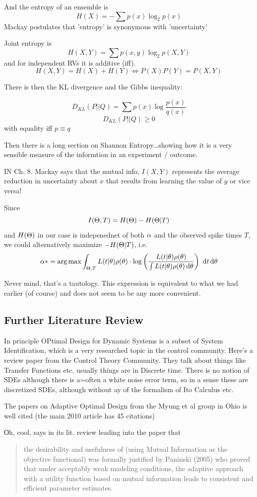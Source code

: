 \documentclass{article}
\begin{document}
And the entropy of an ensemble is 
$$ H(X) = -\sum p(x) \log_2 p(x)$$
Mackay postulates that 'entropy' is synonymous with 'uncertainty'

Joint entropy is 
$$ H(X,Y) = \sum p(x,y) \log_2 p(X,Y)$$ and for independent RVs it is additive
(iff). 
$$
H(X,Y) =  H(X) + H(Y) \iff P(X)P(Y) = P(X,Y)
$$

There is then the KL divergence  and the Gibbs inequality:

$$D_{KL} (P||Q) = \sum p(x) \log \frac{p(x)}{q(x)}$$
$$D_{KL} (P||Q)  \geq 0$$ with equality iff $p \equiv q$

Then there is a long section on Shannon Entropy\ldots showing how it is a very
sensible measure of the informtion in an experiment / outcome. 

IN Ch. 8. Mackay says that the mutual info, $I(X,Y)$ represents the average
reduction in uncertainty about $x$ that results from learning the value of $y$
or vice versa! 

Since 
$$I({\Theta}, T) = H({\Theta}) - H({\Theta}|T)$$ and $H({\Theta})$ in our case is indepenednet of
both ${\alpha}$ and the observed spike times $T$, we could alternatively maximize
$-H({\Theta}|T)$, i.e.
$$
\a* = \argmax \int_{\Th, T}  L(t|\th) \rho(\th) \cdot
 \log \left( \frac{L(t|\th) \rho(\th)}{ \int L(t|\th) \rho(\th) \intd{\th}}\right) 
 \, \intd{t} \intd{\th}$$

Never mind, that's a tautology. This expression is equivalent to what we had
earlier (of course) and does not seem to be any more
convenient.

\subsection{Further Literature Review}	
In principle OPtimal Design for Dynamic Systems is a subset of System
Identification, which is a very researched topic in the control community.
Here's a review paper \cite{Gevers2011} from the Control Theory Community. 
They talk about things like Transfer Functions etc. usually things are in
Discrete time. There is no notion of SDEs although there is a=often a white
noise error term, so in a sense these are discretized SDEs, although without ay
of the formalism of Ito Calculus etc. 

The papers on Adaptive Optimal Design from the Myung et al group in Ohio is well
cited (the main 2010 \cite{Cavagnaro2010} article has 45 citations) 

Оh, cool,  \cite{Cavagnaro2010} says in its lit. review leading into the paper
that 
\begin{quote}
the desirability and usefulness of (using Mutual Information as the objective
functional) was formally justified by Paninski (2005) who proved that under
acceptably weak modeling conditions, the adaptive approach with a utility function
based on mutual information leads to consistent and efficient parameter
estimates. 
\end{quote}
\end{document}
